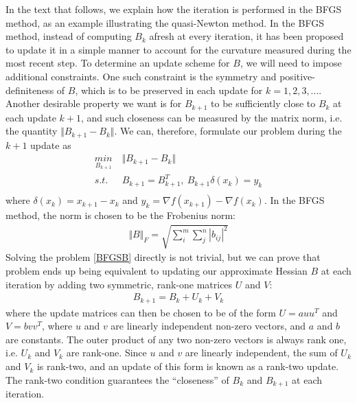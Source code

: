 In the text that follows, we explain how the iteration is performed in the BFGS method, as an example illustrating the quasi-Newton method. In the BFGS method, instead of computing $B_k$ afresh at every iteration, it has been proposed to update it in a simple manner to account for the curvature measured during the most recent step. To determine an update scheme for $B$, we will need to impose additional constraints. One such constraint is the symmetry and positive-definiteness of $B$, which is to be preserved in each update for $k = 1,2, 3, ...$. Another desirable property we want is for $B_{k+1}$ to be sufficiently close to $B_k$ at each update $k+1$, and such closeness can be measured by the matrix norm, i.e. the quantity $\Vert B_{k+1} - B_{k} \Vert$. We can, therefore, formulate our problem during the $k+1$ update as 
\begin{equation}
	\begin{aligned}
		 \underset{B_{k+1}}{min} \  &  \Vert B_{k+1} - B_{k} \Vert\\
		s.t.\ \  & B_{k+1}= B_{k+1}^T, \ B_{k+1}\delta(x_k)  = y_k \\
	\end{aligned}
	\label{BFGSB}
\end{equation}
where $\delta(x_k) = x_{k+1} -x_k$ and $y_k = \nabla f(x_{k+1}) - \nabla f(x_k)$. In the BFGS method, the norm is chosen to be the Frobenius norm:
\begin{align*}
\Vert B \Vert_F = \sqrt{\sum_{i}^{m} \sum_{j}^{n} |b_{ij}|^2} 
\end{align*}
Solving the problem \ref{BFGSB} directly is not trivial, but we can prove that problem ends up being equivalent to updating our approximate Hessian $B$ at each iteration by adding two symmetric, rank-one matrices $U$ and $V$:
\begin{align*}
 B_{k+1} = B_k + U_k + V_k
\end{align*}
where the update matrices can then be chosen to be of the form $U = a u u^T$ and $V = b v v^T$, where $u$ and $v$ are linearly independent non-zero vectors, and $a$ and $b$ are constants.  The outer product of any two non-zero vectors is always rank one, i.e. $U_k$ and $V_k$ are rank-one. Since $u$ and $v$ are linearly independent, the sum of $U_k$ and $V_k$ is rank-two, and an update of this form is known as a rank-two update. The rank-two condition guarantees the “closeness” of $B_k$ and $B_{k+1}$ at each iteration. 

